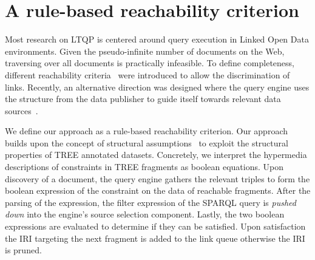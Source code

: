 \section{A rule-based reachability criterion}



Most research on LTQP is centered around query execution in Linked Open Data environments.
Given the pseudo-infinite number of documents on the Web, traversing over all documents is practically infeasible.
To define completeness, different reachability criteria~\cite{hartig2012} were introduced to allow the discrimination of links.
Recently, an alternative direction was designed where the query engine uses the structure from the data publisher to guide itself towards relevant data sources~\cite{taelman2023, verborgh2020}.

We define our approach as a rule-based reachability criterion.
Our approach builds upon the concept of structural assumptions~\cite{taelman2023} to exploit the structural properties of TREE annotated datasets.
Concretely, we interpret the hypermedia descriptions of constraints in TREE fragments as boolean equations.
Upon discovery of a document, the query engine gathers the relevant triples to form the boolean expression of the constraint on the data of reachable fragments.
After the parsing of the expression, the filter expression of the SPARQL query is \textit{pushed down} into the engine's source selection component.
Lastly, the two boolean expressions are evaluated to determine if they can be satisfied. 
Upon satisfaction the IRI targeting the next fragment is added to the link queue otherwise the IRI is pruned.

